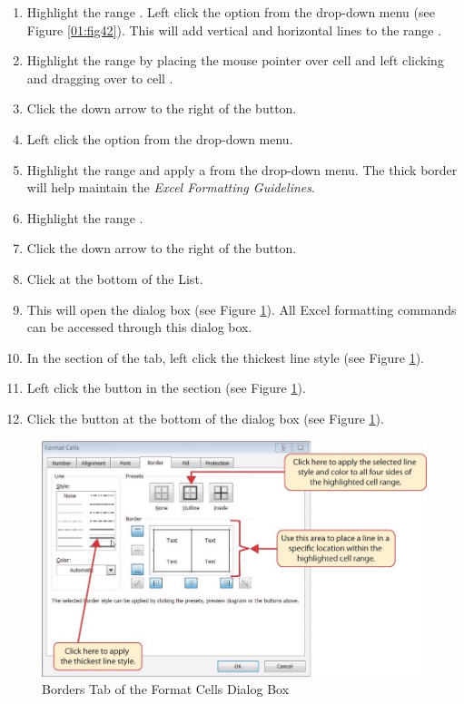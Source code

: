 \begin{enumerate}[resume]
	\item Highlight the range . Left click the  option from the  drop-down menu (see Figure \ref{01:fig42}). This will add vertical and horizontal lines to the range .
	\item Highlight the range  by placing the mouse pointer over cell  and left clicking and dragging over to cell .
	\item Click the down arrow to the right of the  button.
	\item Left click the  option from the  drop-down menu.
	\item Highlight the range  and apply a  from the drop-down menu. The thick border will help maintain the \textit{Excel Formatting Guidelines}.
	\item Highlight the range .
	\item Click the down arrow to the right of the  button.
	\item Click  at the bottom of the List.
	\item This will open the  dialog box (see Figure \ref{01:fig43}). All Excel formatting commands can be accessed through this dialog box.
	\item In the  section of the  tab, left click the thickest line style (see Figure \ref{01:fig43}).
	\item Left click the  button in the  section (see Figure \ref{01:fig43}).
	\item Click the  button at the bottom of the dialog box (see Figure \ref{01:fig43}).
\end{enumerate}

\begin{figure}[H]
	\centering
	\includegraphics[width=\maxwidth{.95\linewidth}]{gfx/ch01_fig43}
	\caption{Borders Tab of the Format Cells Dialog Box}
	\label{01:fig43}
\end{figure}

